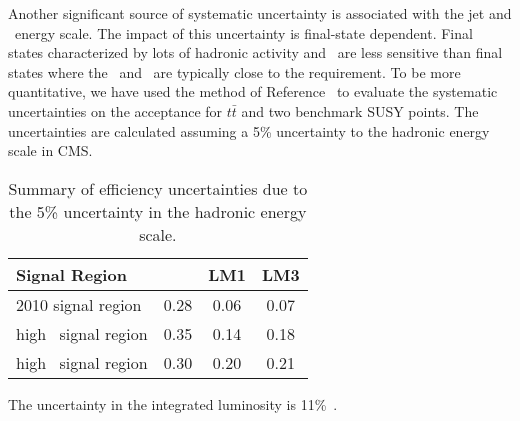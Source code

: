 Another significant source of systematic uncertainty is 
associated with the jet and \met\ energy scale.  The impact
of this uncertainty is final-state dependent.  Final
states characterized by lots of hadronic activity and \met\ are 
less sensitive than final states where the \met\ and \Ht\
are typically close to the requirement.  To be more quantitative,
we have used the method of Reference~\cite{ref:top} to evaluate
the systematic uncertainties on the acceptance for $t\bar{t}$ 
and two benchmark SUSY points.  The uncertainties are calculated
assuming a 5\% uncertainty to the hadronic energy scale in CMS.

\begin{table}[hbt]
\begin{center}
\caption{\label{tab:jetmet} 
Summary of efficiency uncertainties due to the 5\% uncertainty in the hadronic energy scale.
}
\vspace{.25cm}
\begin{tabular}{l|ccc}
\hline
Signal Region             & \ttbar  &   LM1   &   LM3    \\
\hline
2010 signal region        &  0.28   &  0.06   &  0.07    \\
high \met\ signal region  &  0.35   &  0.14   &  0.18    \\ 
high \Ht\ signal region   &  0.30   &  0.20   &  0.21    \\
\hline
\end{tabular}
\end{center}
\end{table}

The uncertainty in the integrated luminosity is 11\%~\cite{ref:lumi}.
